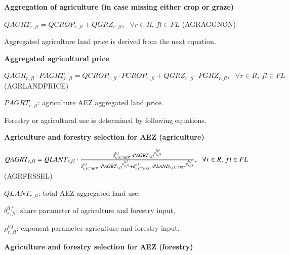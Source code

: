 \documentclass[10pt,a4paper,titlepage,dvipdfmx]{book}
\begin{document}
\begin{flushleft}\textbf{Aggregation of agriculture (in case missing either crop or graze)}\end{flushleft}


\begin{center}$QAGRT_{r,fl}=QCROP_{r,fl}+QGRZ_{r,fl},\,\,\,\,\forall r\in R,\,fl\in FL$ (AGRAGGNON)
\end{center}

Aggregated agriculture land price is derived from the next equation.

\begin{flushleft}\textbf{Aggregated agricultural price}\end{flushleft}


\begin{center}$QAGR_{r,fl}\cdot PAGRT_{r,fl}=QCROP_{r,fl}\cdot PCROP_{r,fl}+QGRZ_{r,fl}\cdot PGRZ_{r,fl},\,\,\,\,\forall r\in R,\,fl\in FL$ (AGRLANDPRICE)
\end{center}

\begin{flushleft} $PAGRT_{r,fl}$: agriculture AEZ aggregated land price. \end{flushleft}

Forestry or agricultural use is determined by following equations.

\begin{flushleft}\textbf{Agriculture and forestry selection for AEZ (agriculture)}\end{flushleft}


\begin{center}$QAGRT_{r,fl}=QLANT_{r,fl}\cdot \frac{\delta _{r,fl,"AGR"}^{ltf}\cdot PAGR{T_{r,fl}}^{\rho _{r,fl}^{ltf}}}{\delta _{r,fl,"AGR"}^{ltf}\cdot PAGR{T_{r,fl}}^{\rho _{r,fl}^{ltf}}+\delta _{r,fl,"FRS"}^{ltf}\cdot PLAN{D_{r,fl,"FRS"}}^{\rho _{r,fl}^{ltf}}},\,\,\,\,\forall r\in R,\,fl\in FL$ (AGRFRSSEL)
\end{center}

\begin{flushleft}
$QLANT_{r,fl}$: total AEZ aggregated land use,

$\delta _{r,fl}^{ltf}$: share parameter of agriculture and forestry input,

$\rho _{r,fl}^{ltf}$: exponent parameter agriculture and forestry input.
\end{flushleft}

\begin{flushleft}\textbf{Agriculture and forestry selection for AEZ (forestry)}\end{flushleft}
\end{document}

